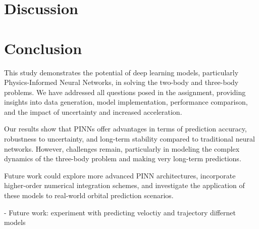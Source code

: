 \documentclass[12pt,a4paper]{article}
\begin{document}
\section{Discussion}

\section{Conclusion}
\label{sec:conclusion}

This study demonstrates the potential of deep learning models, particularly Physics-Informed Neural Networks, in solving the two-body and three-body problems. We have addressed all questions posed in the assignment, providing insights into data generation, model implementation, performance comparison, and the impact of uncertainty and increased acceleration.

Our results show that PINNs offer advantages in terms of prediction accuracy, robustness to uncertainty, and long-term stability compared to traditional neural networks. However, challenges remain, particularly in modeling the complex dynamics of the three-body problem and making very long-term predictions.

Future work could explore more advanced PINN architectures, incorporate higher-order numerical integration schemes, and investigate the application of these models to real-world orbital prediction scenarios.

- Future work: experiment with predicting veloctiy and trajectory differnet models


\end{document}
